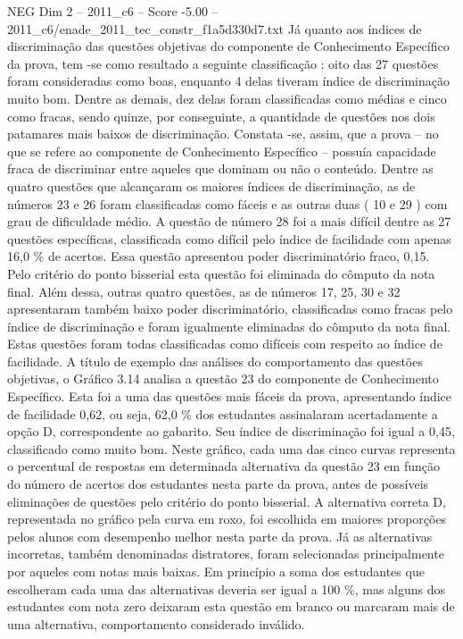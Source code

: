 \begin{textsample}{NEG Dim 2 – 2011\_c6 – Score -5.00 – 2011\_c6/enade\_2011\_tec\_constr\_f1a5d330d7.txt}
Já quanto aos índices de discriminação das questões objetivas do componente de Conhecimento Específico da prova, tem -se como resultado a seguinte classificação : oito das 27 questões foram consideradas como boas, enquanto 4 delas tiveram índice de discriminação muito bom.
Dentre as demais, dez delas foram classificadas como médias e cinco como fracas, sendo quinze, por conseguinte, a quantidade de questões nos dois patamares mais baixos de discriminação.
Constata -se, assim, que a prova – no que se refere ao componente de Conhecimento Específico – possuía capacidade fraca de discriminar entre aqueles que dominam ou não o conteúdo.
Dentre as quatro questões que alcançaram os maiores índices de discriminação, as de números 23 e 26 foram classificadas como fáceis e as outras duas ( 10 e 29 ) com grau de dificuldade médio.
A questão de número 28 foi a mais difícil dentre as 27 questões específicas, classificada como difícil pelo índice de facilidade com apenas 16,0 \% de acertos.
Essa questão apresentou poder discriminatório fraco, 0,15.
Pelo critério do ponto bisserial esta questão foi eliminada do cômputo da nota final.
Além dessa, outras quatro questões, as de números 17, 25, 30 e 32 apresentaram também baixo poder discriminatório, classificadas como fracas pelo índice de discriminação e foram igualmente eliminadas do cômputo da nota final.
Estas questões foram todas classificadas como difíceis com respeito ao índice de facilidade.
A título de exemplo das análises do comportamento das questões objetivas, o Gráfico 3.14 analisa a questão 23 do componente de Conhecimento Específico.
Esta foi a uma das questões mais fáceis da prova, apresentando índice de facilidade 0,62, ou seja, 62,0 \% dos estudantes assinalaram acertadamente a opção D, correspondente ao gabarito.
Seu índice de discriminação foi igual a 0,45, classificado como muito bom.
Neste gráfico, cada uma das cinco curvas representa o percentual de respostas em determinada alternativa da questão 23 em função do número de acertos dos estudantes nesta parte da prova, antes de possíveis eliminações de questões pelo critério do ponto bisserial.
A alternativa correta D, representada no gráfico pela curva em roxo, foi escolhida em maiores proporções pelos alunos com desempenho melhor nesta parte da prova.
Já as alternativas incorretas, também denominadas distratores, foram selecionadas principalmente por aqueles com notas mais baixas.
Em princípio a soma dos estudantes que escolheram cada uma das alternativas deveria ser igual a 100 \%, mas alguns dos estudantes com nota zero deixaram esta questão em branco ou marcaram mais de uma alternativa, comportamento considerado inválido.

\end{textsample}
